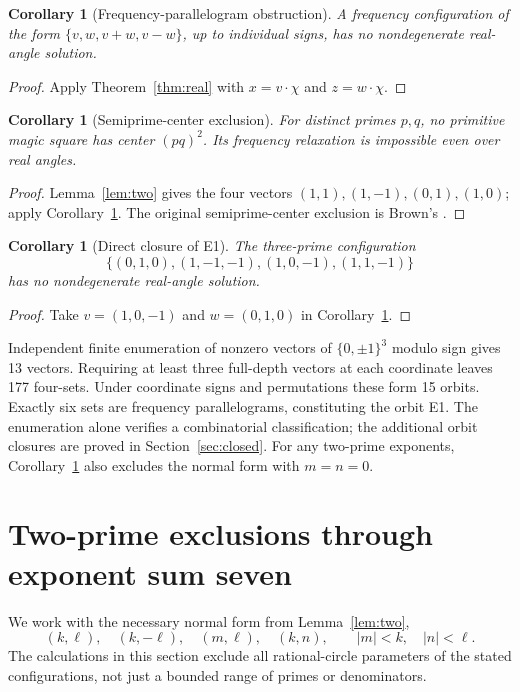 \documentclass[11pt,letterpaper]{article}
\newtheorem{corollary}[theorem]{Corollary}
\theoremstyle{definition}\newtheorem{definition}[theorem]{Definition}
\theoremstyle{remark}\newtheorem{remark}[theorem]{Remark}
\begin{document}
\begin{corollary}[Frequency-parallelogram obstruction]\label{cor:para}
A frequency configuration of the form $\{v,w,v+w,v-w\}$, up to individual signs, has no nondegenerate real-angle solution.
\end{corollary}
\begin{proof}
Apply Theorem~\ref{thm:real} with $x=v\cdot\chi$ and $z=w\cdot\chi$.
\end{proof}

\begin{corollary}[Semiprime-center exclusion]\label{cor:B}
For distinct primes $p,q$, no primitive magic square has center $(pq)^2$. Its frequency relaxation is impossible even over real angles.
\end{corollary}
\begin{proof}
Lemma~\ref{lem:two} gives the four vectors $(1,1),(1,-1),(0,1),(1,0)$; apply Corollary~\ref{cor:para}. The original semiprime-center exclusion is Brown's \cite{Brown417}.
\end{proof}

\begin{corollary}[Direct closure of E1]\label{cor:E1}
The three-prime configuration
\[
\{(0,1,0),(1,-1,-1),(1,0,-1),(1,1,-1)\}
\]
has no nondegenerate real-angle solution.
\end{corollary}
\begin{proof}
Take $v=(1,0,-1)$ and $w=(0,1,0)$ in Corollary~\ref{cor:para}.
\end{proof}
Independent finite enumeration of nonzero vectors of $\{0,\pm1\}^3$ modulo sign gives 13 vectors. Requiring at least three full-depth vectors at each coordinate leaves 177 four-sets. Under coordinate signs and permutations these form 15 orbits. Exactly six sets are frequency parallelograms, constituting the orbit E1. The enumeration alone verifies a combinatorial classification; the additional orbit closures are proved in Section~\ref{sec:closed}. For any two-prime exponents, Corollary~\ref{cor:para} also excludes the normal form with $m=n=0$.

\section{Two-prime exclusions through exponent sum seven}\label{sec:two}
We work with the necessary normal form from Lemma~\ref{lem:two},
\[
(k,\ell),\quad(k,-\ell),\quad(m,\ell),\quad(k,n),
\qquad |m|<k,\quad |n|<\ell.
\]
The calculations in this section exclude all rational-circle parameters of the stated configurations, not just a bounded range of primes or denominators.
\end{document}

